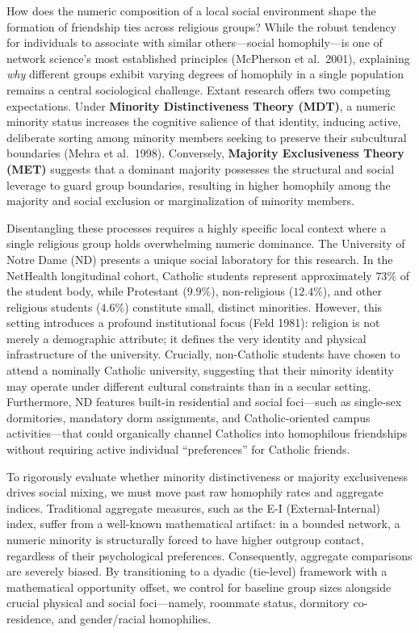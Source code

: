 \documentclass[
  letterpaper,
  DIV=11,
  numbers=noendperiod]{scrartcl}
\begin{document}
How does the numeric composition of a local social environment shape the
formation of friendship ties across religious groups? While the robust
tendency for individuals to associate with similar others---social
homophily---is one of network science's most established principles
(McPherson et al.~2001), explaining \emph{why} different groups exhibit
varying degrees of homophily in a single population remains a central
sociological challenge. Extant research offers two competing
expectations. Under \textbf{Minority Distinctiveness Theory (MDT)}, a
numeric minority status increases the cognitive salience of that
identity, inducing active, deliberate sorting among minority members
seeking to preserve their subcultural boundaries (Mehra et al.~1998).
Conversely, \textbf{Majority Exclusiveness Theory (MET)} suggests that a
dominant majority possesses the structural and social leverage to guard
group boundaries, resulting in higher homophily among the majority and
social exclusion or marginalization of minority members.

Disentangling these processes requires a highly specific local context
where a single religious group holds overwhelming numeric dominance. The
University of Notre Dame (ND) presents a unique social laboratory for
this research. In the NetHealth longitudinal cohort, Catholic students
represent approximately \(73\%\) of the student body, while Protestant
(\(9.9\%\)), non-religious (\(12.4\%\)), and other religious students
(\(4.6\%\)) constitute small, distinct minorities. However, this setting
introduces a profound institutional focus (Feld 1981): religion is not
merely a demographic attribute; it defines the very identity and
physical infrastructure of the university. Crucially, non-Catholic
students have chosen to attend a nominally Catholic university,
suggesting that their minority identity may operate under different
cultural constraints than in a secular setting. Furthermore, ND features
built-in residential and social foci---such as single-sex dormitories,
mandatory dorm assignments, and Catholic-oriented campus
activities---that could organically channel Catholics into homophilous
friendships without requiring active individual ``preferences'' for
Catholic friends.

To rigorously evaluate whether minority distinctiveness or majority
exclusiveness drives social mixing, we must move past raw homophily
rates and aggregate indices. Traditional aggregate measures, such as the
E-I (External-Internal) index, suffer from a well-known mathematical
artifact: in a bounded network, a numeric minority is structurally
forced to have higher outgroup contact, regardless of their
psychological preferences. Consequently, aggregate comparisons are
severely biased. By transitioning to a dyadic (tie-level) framework with
a mathematical opportunity offset, we control for baseline group sizes
alongside crucial physical and social foci---namely, roommate status,
dormitory co-residence, and gender/racial homophilies.
\end{document}
